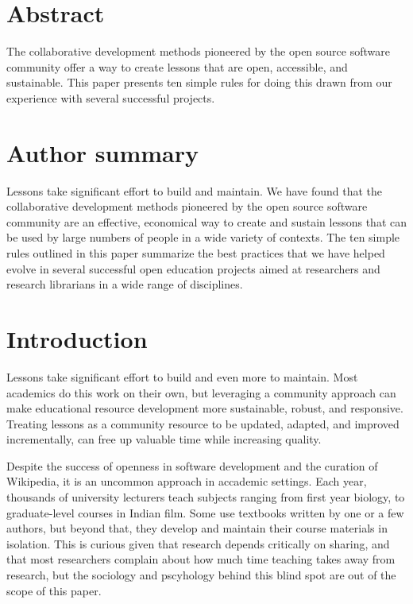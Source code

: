 \documentclass[10pt,letterpaper]{article}
\begin{document}

\linenumbers

\section*{Abstract}

The collaborative development methods pioneered by the open source software community
offer a way to create lessons that are open, accessible, and sustainable.
This paper presents ten simple rules for doing this
drawn from our experience with several successful projects.

\section*{Author summary}

Lessons take significant effort to build and  maintain.
We have found that
the collaborative development methods pioneered by the open source software community
are an effective, economical way to create and sustain lessons
that can be used by large numbers of people in a wide variety of contexts.
The ten simple rules outlined in this paper
summarize the best practices that we have helped evolve
in several successful open education projects aimed at researchers and research librarians
in a wide range of disciplines.


\section*{Introduction}

Lessons take significant effort to build and even more to maintain.
Most academics do this work on their own,
but leveraging a community approach
can make educational resource development more sustainable, robust, and responsive.
Treating lessons as a community resource
to be updated, adapted, and improved incrementally,
can free up valuable time while increasing quality.

Despite the success of openness in software development and the curation of Wikipedia,
it is an uncommon approach in accademic settings.
Each year,
thousands of university lecturers teach subjects ranging from first year biology,
to graduate-level courses in Indian film.
Some use textbooks written by one or a few authors,
but beyond that,
they develop and maintain their course materials in isolation.
This is curious given that research depends critically on sharing,
and that most researchers complain about how much time teaching takes away from research,
but the sociology and pscyhology behind this blind spot are out of the scope of this paper.
\end{document}
